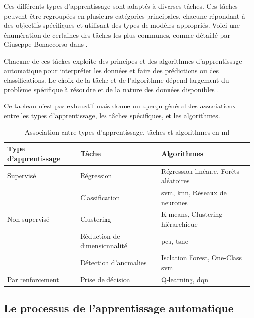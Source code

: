 Ces différents types d'apprentissage sont adaptés à diverses tâches. Ces tâches peuvent être regroupées en plusieurs catégories principales, chacune répondant à des objectifs spécifiques et utilisant des types de modèles appropriés. Voici une énumération de certaines des tâches les plus communes, comme détaillé par Giuseppe Bonaccorso dans \cite{Bonaccorso_2018}.

Chacune de ces tâches exploite des principes et des algorithmes d'apprentissage automatique pour interpréter les données et faire des prédictions ou des classifications. Le choix de la tâche et de l'algorithme dépend largement du problème spécifique à résoudre et de la nature des données disponibles \cite{ml_task, Flach_2012}.

Ce tableau n'est pas exhaustif mais donne un aperçu général des associations entre les types d'apprentissage, les tâches spécifiques, et les algorithmes.

\begin{table}[h]
\centering
\begin{tabular}{|l|l|l|}
    \hline
    \textbf{Type d'apprentissage} & \textbf{Tâche}             & \textbf{Algorithmes}                       \\ \hline
    Supervisé                     & Régression                 & Régression linéaire, Forêts aléatoires     \\ \cline{2-3} 
                                  & Classification             & \acs{svm}, \acs{knn}, Réseaux de neurones             \\ \hline
    Non supervisé                 & Clustering                 & K-means, Clustering hiérarchique           \\ \cline{2-3} 
                                  & Réduction de dimensionnalité & \acs{pca}, \acs{tsne}                               \\ \cline{2-3}
                                  & Détection d'anomalies      & Isolation Forest, One-Class \acs{svm}            \\ \hline
    Par renforcement              & Prise de décision         & Q-learning, \acs{dqn}            \\ \hline
\end{tabular}
\caption{Association entre types d'apprentissage, tâches et algorithmes en \ac{ml}}
\label{table:mapping-type-task-algorithms}
\end{table}

\newpage
\subsection{Le processus de l'apprentissage automatique} \hspace{0pt}
\label{ch:1:section:ml-process}


